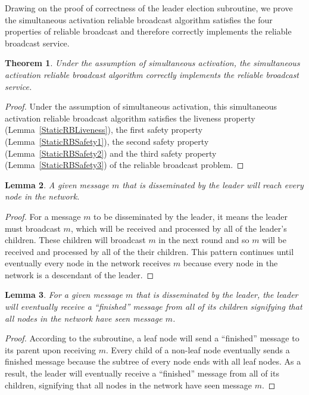 \documentclass[english]{article}
\newtheorem{theorem}{Theorem}[section]
\newtheorem{lemma}[theorem]{Lemma}
\begin{document}
Drawing on the proof of correctness of the leader election subroutine, we prove the simultaneous activation reliable broadcast algorithm satisfies the four properties of reliable broadcast and therefore correctly implements the reliable broadcast service.

\begin{theorem}
\label{StaticReliableBroadcast}
Under the assumption of simultaneous activation, the simultaneous activation reliable broadcast algorithm correctly implements the reliable broadcast service.
\end{theorem}
\begin{proof}
Under the assumption of simultaneous activation, this simultaneous activation reliable broadcast algorithm satisfies the liveness property (Lemma~\ref{StaticRBLiveness}), 
the first safety property (Lemma~\ref{StaticRBSafety1}),
the second safety property (Lemma~\ref{StaticRBSafety2}) and 
the third safety property (Lemma~\ref{StaticRBSafety3}) of the reliable broadcast problem.
\end{proof}

\begin{lemma}
\label{StaticMessageDissemination}
A given message $m$ that is disseminated by the leader will reach every node in the network.
\end{lemma}
\begin{proof}

For a message $m$ to be disseminated by the leader, it means the leader must broadcast $m$, which will be received and processed by all of the leader's children. These children will broadcast $m$ in the next round and so $m$ will be received and processed by all of the their children. This pattern continues until eventually every node in the network receives $m$ because every node in the network is a descendant of the leader. 

\end{proof}


\begin{lemma}
\label{StaticConfirmationMessage}
For a given message $m$ that is disseminated by the leader, the leader will eventually receive a ``finished'' message from all of its children signifying that all nodes in the network have seen message $m$.
\end{lemma}
\begin{proof}

According to the subroutine, a leaf node will send a ``finished'' message to its parent upon receiving $m$. Every child of a non-leaf node eventually sends a finished message because the subtree of every node ends with all leaf nodes. As a result, the leader will eventually receive a ``finished'' message from all of its children, signifying that all nodes in the network have seen message $m$.

\end{proof}
\end{document}
